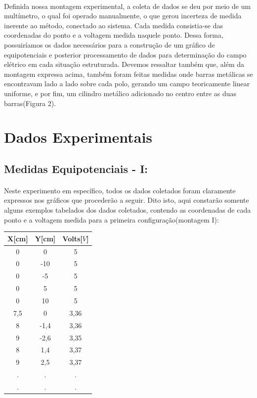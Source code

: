 \documentclass[column,brazilian,12pt,a4paper,final]{article}
\begin{document}
\justifying 

\paragraph{}
Definida nossa montagem experimental, a coleta de dados se deu por meio de um multímetro, o qual foi operado manualmente, o que gerou incerteza de medida inerente ao método, conectado ao sistema. Cada medida consistia-se das coordenadas do ponto e a voltagem medida naquele ponto. Dessa forma, possuiríamos os dados necessários para a construção de um gráfico de equipotenciais e posterior processamento de dados para determinação do campo elétrico em cada situação estruturada. Devemos ressaltar também que, além da montagem expressa acima, também foram feitas medidas onde barras metálicas se encontravam lado a lado sobre cada polo, gerando um campo teoricamente linear uniforme, e por fim, um cilindro metálico adicionado no centro entre as duas barras(Figura 2).





\section{Dados Experimentais}
\subsection{Medidas Equipotenciais - I:}
\paragraph{}
Neste experimento em específico, todos os dados coletados foram claramente expressos nos gráficos que procederão a seguir. Dito isto, aqui constarão somente alguns exemplos tabelados dos dados coletados, contendo as coordenadas de cada ponto e a voltagem medida para a primeira configuração(montagem I):

\linespread{1}
\begin{table}[h!]
\centering
\vspace{0.5cm}
\begin{tabular}{c|c|c}
\hline
   X[cm]  &  Y[cm] & Volts[$V$]
   \\
   \hline
   0 & 0& 5\\
   0 & -10&5 \\
   0 & -5&5 \\
   0 & 5& 5\\
   0 & 10& 5\\
   7,5 & 0& 3,36\\
   8 & -1,4& 3,36\\
   9 & -2,6 & 3,35\\
   8 & 1,4& 3,37\\
   9 & 2,5& 3,37\\
   . & . & .\\
   .&.&.\\
   \hline
\end{tabular}
\linespread{1}
\end{table}
\justifying
\end{document}
